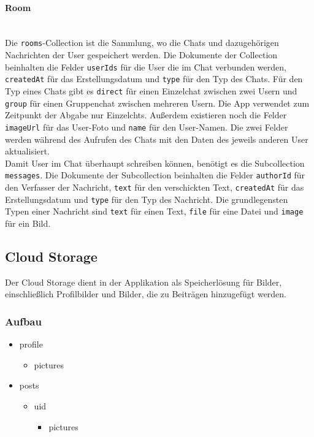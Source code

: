 \paragraph{Room}\mbox{} \\
Die \texttt{rooms}-Collection ist die Sammlung, wo die Chats und dazugehörigen Nachrichten der User gespeichert werden. Die Dokumente der Collection beinhalten die Felder \texttt{userIds} für die User die im Chat verbunden werden, \texttt{createdAt} für das Erstellungsdatum und \texttt{type} für den Typ des Chats. Für den Typ eines Chats gibt es \texttt{direct} für einen Einzelchat zwischen zwei Usern und \texttt{group} für einen Gruppenchat zwischen mehreren Usern. Die App verwendet zum Zeitpunkt der Abgabe nur Einzelchts. Außerdem existieren noch die Felder \texttt{imageUrl} für das User-Foto und \texttt{name} für den User-Namen. Die zwei Felder werden während des Aufrufen des Chats mit den Daten des jeweils anderen User aktualisiert.
\\
Damit User im Chat überhaupt schreiben können, benötigt es die Subcollection \texttt{messages}. Die Dokumente der Subcollection beinhalten die Felder \texttt{authorId} für den Verfasser der Nachricht, \texttt{text} für den verschickten Text, \texttt{createdAt} für das Erstellungsdatum und \texttt{type} für den Typ des Nachricht. Die grundlegensten Typen einer Nachricht sind \texttt{text} für einen Text, \texttt{file} für eine Datei und \texttt{image} für ein Bild.

\subsection{Cloud Storage}
Der Cloud Storage dient in der Applikation als Speicherlösung für Bilder, einschließlich Profilbilder und Bilder, die zu Beiträgen hinzugefügt werden.

\subsubsection{Aufbau}
\begin{itemize}
  \item profile
        \begin{itemize}
          \item pictures
        \end{itemize}
  \item posts
        \begin{itemize}
          \item {uid}
                \begin{itemize}
                  \item pictures
                \end{itemize}
        \end{itemize}
\end{itemize}

